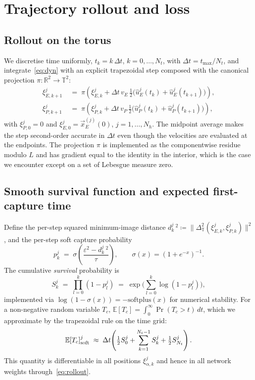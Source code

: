\documentclass[11pt]{article}
\newcommand{\xE}{\vec{x}_E}
\newcommand{\TT}{\mathbb{T}^{2}}
\newcommand{\RR}{\mathbb{R}}
\newcommand{\E}{\mathbb{E}}
\begin{document}
\section{Trajectory rollout and loss}
\label{sec:loss}
\subsection{Rollout on the torus}
We discretise time uniformly,
$t_k = k\,\Delta t$, $k=0,\dots,N_t$, with $\Delta t = t_{\max}/N_t$,
and integrate~\eqref{eq:dyn} with an explicit trapezoidal step composed
with the canonical projection $\pi:\RR^2\to\TT$:
\begin{equation}
\label{eq:rollout}
\begin{aligned}
\xi^j_{E,k+1}
&\;=\;
\pi\!\left(\xi^j_{E,k} + \Delta t\, v_E\,
\tfrac{1}{2}\!\big(\hat u^{j}_{E}(t_k)+\hat u^{j}_{E}(t_{k+1})\big)\right), \\
\xi^j_{P,k+1}
&\;=\;
\pi\!\left(\xi^j_{P,k} + \Delta t\, v_P\,
\tfrac{1}{2}\!\big(\hat u^{j}_{P}(t_k)+\hat u^{j}_{P}(t_{k+1})\big)\right),
\end{aligned}
\end{equation}
with $\xi^j_{P,0} = 0$ and $\xi^j_{E,0} = \xE^{(j)}(0)$, $j=1,\dots,N_h$.
The midpoint average makes the step second-order accurate in $\Delta t$
even though the velocities are evaluated at the endpoints.  The
projection $\pi$ is implemented as the componentwise residue modulo
$L$ and has gradient equal to the identity in the interior, which is
the case we encounter except on a set of Lebesgue measure zero.

\subsection{Smooth survival function and expected first-capture time}
Define the per-step squared minimum-image distance
$d^{j}_{k}\,^2 \coloneqq \|\Delta_\TT(\xi^j_{E,k},\xi^j_{P,k})\|^2$,
and the per-step soft capture probability
\begin{equation}
p^j_k \;=\; \sigma\!\left(\frac{\varepsilon^2 - d^j_k\,^2}{\tau}\right),
\qquad \sigma(x) = (1+e^{-x})^{-1}.
\end{equation}
The cumulative \emph{survival} probability is
\begin{equation}
S^j_k \;=\; \prod_{l=0}^{k} (1 - p^j_l)
       \;=\; \exp\Big(\sum_{l=0}^{k} \log(1-p^j_l)\Big),
\end{equation}
implemented via $\log(1-\sigma(x)) = -\mathrm{softplus}(x)$ for numerical
stability.  For a non-negative random variable $T_c$,
$\E[T_c]=\int_0^\infty \Pr(T_c>t)\,dt$, which we approximate by the
trapezoidal rule on the time grid:
\begin{equation}
\E[T_c]^{j}_{\rm soft}
\;\approx\;
\Delta t\!\left(
\tfrac{1}{2}S^j_0 + \sum_{k=1}^{N_t-1} S^j_k + \tfrac{1}{2} S^j_{N_t}
\right).
\end{equation}
This quantity is differentiable in all positions $\xi^j_{\alpha,k}$ and
hence in all network weights through~\eqref{eq:rollout}.
\end{document}
